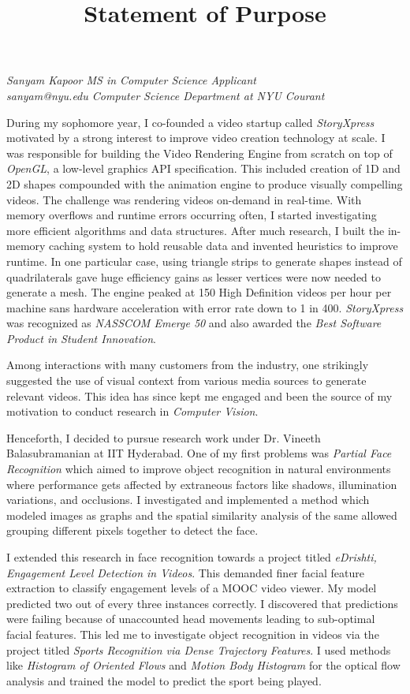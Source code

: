 \documentclass{article}
\title{Statement of Purpose}
\begin{document}
\maketitle

\textit{Sanyam Kapoor \hfill MS in Computer Science Applicant} \\
\textit{sanyam@nyu.edu \hfill Computer Science Department at NYU Courant}

\justify
During my sophomore year, I co-founded a video startup called {\it StoryXpress} motivated by a strong interest to improve
video creation technology at scale. I was responsible for building the Video Rendering Engine from scratch on top of
{\it OpenGL}, a low-level graphics API specification. This included creation of 1D and 2D shapes compounded with the
animation engine to produce visually compelling videos. The challenge was rendering videos on-demand in real-time. With
memory overflows and runtime errors occurring often, I started investigating more efficient algorithms and data structures.
After much research, I built the in-memory caching system to hold reusable data and invented heuristics to improve runtime.
In one particular case, using triangle strips to generate shapes instead of quadrilaterals gave huge efficiency gains as
lesser vertices were now needed to generate a mesh. The engine peaked at 150 High Definition videos per hour per machine
sans hardware acceleration with error rate down to 1 in 400. {\it StoryXpress} was recognized as {\it NASSCOM Emerge 50}
and also awarded the {\it Best Software Product in Student Innovation}.

\justify
Among interactions with many customers from the industry, one strikingly suggested the use of visual context from various
media sources to generate relevant videos. This idea has since kept me engaged and been the source of my motivation to
conduct research in {\it Computer Vision}.

\justify
Henceforth, I decided to pursue research work under Dr. Vineeth Balasubramanian at IIT Hyderabad. One of my first problems
was {\it Partial Face Recognition} which aimed to improve object recognition in natural environments where performance gets
affected by extraneous factors like shadows, illumination variations, and occlusions. I investigated and implemented a method
which modeled images as graphs and the spatial similarity analysis of the same allowed grouping different pixels together
to detect the face.

\justify
I extended this research in face recognition towards a project titled {\it eDrishti, Engagement Level Detection in Videos}.
This demanded finer facial feature extraction to classify engagement levels of a MOOC video viewer. My model predicted two
out of every three instances correctly. I discovered that predictions were failing because of unaccounted head movements
leading to sub-optimal facial features. This led me to investigate object recognition in videos via the project titled
{\it Sports Recognition via Dense Trajectory Features}. I used methods like {\it Histogram of Oriented Flows} and
{\it Motion Body Histogram} for the optical flow analysis and trained the model to predict the sport being played.
\end{document}

